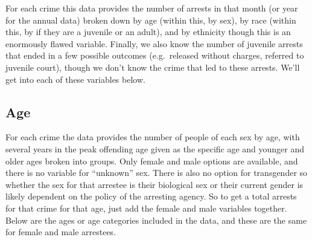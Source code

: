 \documentclass[
  12pt,
  openany]{book}
\begin{document}
For each crime this data provides the number of arrests in that month (or year for the annual data) broken down by age (within this, by sex), by race (within this, by if they are a juvenile or an adult), and by ethnicity though this is an enormously flawed variable. Finally, we also know the number of juvenile arrests that ended in a few possible outcomes (e.g.~released without charges, referred to juvenile court), though we don't know the crime that led to these arrests. We'll get into each of these variables below.

\subsection{Age}\label{age}

For each crime the data provides the number of people of each sex by age, with several years in the peak offending age given as the specific age and younger and older ages broken into groups. Only female and male options are available, and there is no variable for ``unknown'' sex. There is also no option for transgender so whether the sex for that arrestee is their biological sex or their current gender is likely dependent on the policy of the arresting agency. So to get a total arrests for that crime for that age, just add the female and male variables together. Below are the ages or age categories included in the data, and these are the same for female and male arrestees.
\end{document}

